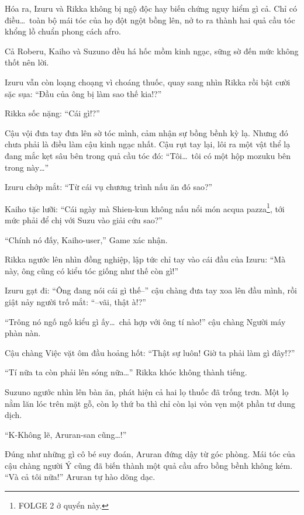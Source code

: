 \documentclass[../main.tex]{subfiles}
\begin{document}
Hóa ra, Izuru và Rikka không bị ngộ độc hay biến chứng nguy hiểm gì cả. Chỉ có điều\dots\ toàn bộ mái tóc của họ đột ngột bồng lên, nở to ra thành hai quả cầu tóc khổng lồ chuẩn phong cách afro.


Cả Roberu, Kaiho và Suzuno đều há hốc mồm kinh ngạc, sững sờ đến mức không thốt nên lời.

Izuru vẫn còn loạng choạng vì choáng thuốc, quay sang nhìn Rikka rồi bật cười sặc sụa: ``Đầu của ông bị làm sao thế kia!?''

Rikka sốc nặng: ``Cái gì!?''

Cậu vội đưa tay đưa lên sờ tóc mình, cảm nhận sự bồng bềnh kỳ lạ. Nhưng đó chưa phải là điều làm cậu kinh ngạc nhất. Cậu rụt tay lại, lôi ra một vật thể lạ đang mắc kẹt sâu bên trong quả cầu tóc đó: ``Tôi\dots\ tôi có một hộp mozuku bên trong này\dots''

Izuru chớp mắt: ``Từ cái vụ chương trình nấu ăn đó sao?''

Kaiho tặc lưỡi: ``Cái ngày mà Shien-kun không nấu nổi món acqua pazza\footnote{{\humanist FOLGE 2} ở quyển này.}, tới mức phải để chị với Suzu vào giải cứu sao?''

``Chính nó đấy, Kaiho-user,'' Game xác nhận.

Rikka ngước lên nhìn đồng nghiệp, lập tức chỉ tay vào cái đầu của Izuru: ``Mà này, ông cũng có kiểu tóc giống như thế còn gì!''

Izuru gạt đi: ``Ông đang nói cái gì thế--'' cậu chàng đưa tay xoa lên đầu mình, rồi giật nảy người trố mắt: ``--vãi, thật à!?''

``Trông nó ngố ngố kiểu gì ấy\dots\ chả hợp với ông tí nào!'' cậu chàng Người máy phàn nàn.

Cậu chàng Việc vặt ôm đầu hoảng hốt: ``Thật sự luôn! Giờ ta phải làm gì đây!?''

``Tí nữa ta còn phải lên sóng nữa\dots'' Rikka khóc không thành tiếng.

Suzuno ngước nhìn lên bàn ăn, phát hiện cả hai lọ thuốc đã trống trơn. Một lọ nằm lăn lóc trên mặt gỗ, còn lọ thứ ba thì chỉ còn lại vỏn vẹn một phần tư dung dịch.

``K-Không lẽ, Aruran-san cũng\dots!''

Đúng như những gì cô bé suy đoán, Aruran đứng dậy từ góc phòng. Mái tóc của cậu chàng người Ý cũng đã biến thành một quả cầu afro bồng bềnh không kém. ``Và cả tôi nữa!'' Aruran tự hào dõng dạc.

\end{document}
